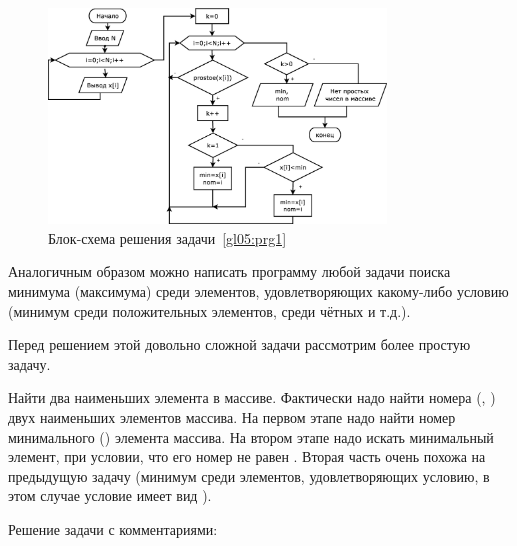 \begin{figure}[htb]
\begin{center}
\includegraphics[width=0.8\textwidth]{img/ris_5_8}
\caption{Блок-схема решения задачи~\ref{gl05:prg1}}
\label{ch05:refDrawing7}
\end{center}
\end{figure}



Аналогичным образом можно написать программу любой задачи поиска минимума (максимума) среди элементов, удовлетворяющих
какому-либо условию (минимум среди положительных элементов, среди чётных и т.д.). 


Перед решением этой довольно сложной задачи рассмотрим более простую задачу.

Найти два наименьших элемента в массиве. Фактически надо найти номера
(, ) двух наименьших элементов
массива. На первом этапе надо найти номер минимального () элемента массива. На втором этапе
надо искать минимальный элемент, при условии, что его номер не равен . Вторая часть очень
похожа на предыдущую задачу (минимум среди элементов, удовлетворяющих условию, в этом случае условие имеет вид
).

Решение задачи с комментариями:

